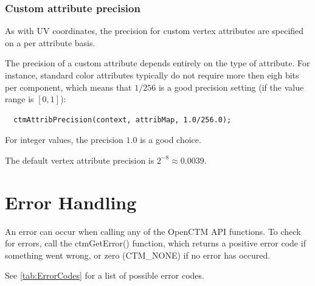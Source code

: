 \subsection{Custom attribute precision}
As with UV coordinates, the precision for custom vertex attributes are
specified on a per attribute basis.

The precision of a custom attribute depends entirely on the type of
attribute. For instance, standard color attributes typically do not require
more then eigh bits per component, which means that $1/256$ is a good
precision setting (if the value range is $[0,1]$):

\begin{lstlisting}
  ctmAttribPrecision(context, attribMap, 1.0/256.0);
\end{lstlisting}

For integer values, the precision $1.0$ is a good choice.

The default vertex attribute precision is $2^{-8} \approx 0.0039$.




\chapter{Error Handling}
An error can occur when calling any of the OpenCTM API functions. To check
for errors, call the ctmGetError() function, which returns a positive error
code if something went wrong, or zero (CTM\_NONE) if no error has occured.

See \ref{tab:ErrorCodes} for a list of possible error codes.

